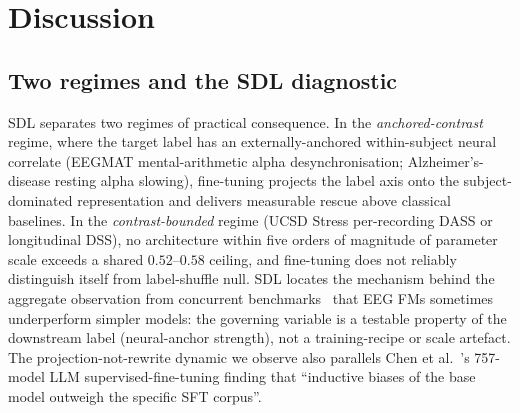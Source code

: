 \section{Discussion}
\label{sec:discussion}

\subsection{Two regimes and the SDL diagnostic}
SDL separates two regimes of practical consequence. In the
\emph{anchored-contrast} regime, where the target label has an
externally-anchored within-subject neural correlate (EEGMAT
mental-arithmetic alpha desynchronisation; Alzheimer's-disease
resting alpha slowing), fine-tuning projects the label axis onto
the subject-dominated representation and delivers measurable rescue
above classical baselines. In the \emph{contrast-bounded} regime
(UCSD Stress per-recording DASS or longitudinal DSS), no
architecture within five orders of magnitude of parameter scale
exceeds a shared $0.52$--$0.58$ ceiling, and fine-tuning does not
reliably distinguish itself from label-shuffle null. SDL locates the
mechanism behind the aggregate observation from concurrent
benchmarks~\citep{eegbench2025,kauffmann2025critique,eegfmbench2025,
adabrain2025} that EEG FMs sometimes underperform simpler models:
the governing variable is a testable property of the downstream
label (neural-anchor strength), not a training-recipe or scale
artefact. The projection-not-rewrite dynamic we observe also
parallels Chen et al.\ \citep{chen2025sft}'s 757-model LLM
supervised-fine-tuning finding that ``inductive biases of the base
model outweigh the specific SFT corpus''.

